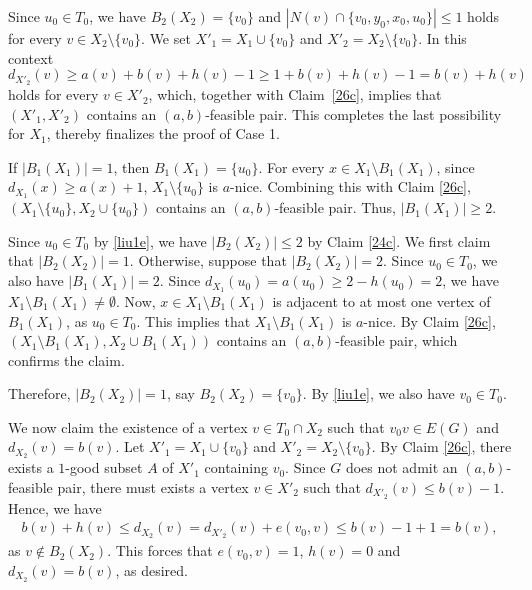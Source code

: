 \documentclass[11p]{elsarticle}
\theoremstyle{definition}
\begin{document}
 Since $u_0\in T_0$, we have $B_2(X_2)=\{v_0\}$ and $ \left|N(v)\cap\{v_0,y_0,x_0,u_0\} \right|\le 1 $ holds  for every $ v\in X_2\setminus\{v_0\} $. We set $X'_1=X_1\cup \{v_0\}$ and $X'_2=X_2\setminus \{v_0\}$. In this context $$d_{X'_2}(v)\ge a(v)+b(v)+h(v)-1\ge 1+b(v)+h(v)-1=b(v)+h(v)$$ holds for every $ v\in X'_2$, which, together with Claim~\ref{26c}, implies that  { $ (X'_1,X'_2) $ contains an $ (a,b) $-feasible pair}. This completes the last possibility for $X_1$, thereby finalizes the proof of Case 1.

\medskip{}

  If	$ \left|B_1(X_1)\right| =1$, then   $ B_1(X_1)=\{u_0\} $.    For every $ x\in X_1\setminus B_1(X_1) $, since $ d_{X_1}(x)\ge a(x)+1 $,    $ X_1\setminus\{u_0\} $ is $ a $-nice. Combining this with   Claim \ref{26c}, {$ (X_1\setminus\{u_0\}, X_2\cup \{u_0\}) $ contains an $ (a,b) $-feasible pair}. Thus,
$ \left|  B_1(X_1)\right| \ge 2 $.

  Since $u_0\in T_0$ by \eqref{liu1e}, we have   $|  B_2(X_2)|\le 2$ by Claim \ref{24c}. We first  claim that $ \left|  B_2(X_2)\right|=1 $. Otherwise, suppose that $ \left|  B_2(X_2)\right|=2 $. Since $u_0\in T_0$, we also have $ \left|  B_1(X_1)\right|=2.$
Since $d_{X_1}(u_0)=a(u_0)\ge 2-h(u_0)=2$, we have   $X_1\setminus B_1(X_1)\ne \emptyset$. Now, $x\in  X_1\setminus B_1(X_1)$ is adjacent to at most one vertex of $B_1(X_1)$, as   $u_0\in T_0$. This implies that $X_1\setminus B_1(X_1)$ is $a$-nice. By Claim \ref{26c},  $(X_1\setminus B_1(X_1), X_2\cup   B_1(X_1))$ {contains an $(a,b)$-feasible pair}, which confirms the claim.

Therefore, $ \left|  B_2(X_2)\right|=1$, say $ B_2(X_2)=\{v_0\}$.  By \eqref{liu1e}, we also have $v_0\in T_0$.


    We now claim the existence of a vertex $v\in T_0\cap X_2 $ such that $v_0v\in E(G) $ and $d_{X_2}(v)=b(v)$. Let $ X'_1=X_1\cup\{v_0\} $ and $ X'_2=X_2\setminus\{v_0\} $. By Claim \ref{26c},   there exists a $ 1 $-good subset $ A $ of  $ X'_1$ containing $v_0$. Since $G$ does not admit an $(a,b)$-feasible pair, there must {exists} a vertex $ v\in X'_2$ such that $ d_{X'_2}(v)\le b(v)-1 $. Hence, we have \begin{align*}
	b(v)+h(v)\le d_{X_2}(v)=	d_{X'_2}(v)+e(v_0,v)\le b(v)-1+1=b(v),
\end{align*}
as $v\not\in B_2(X_2)$. 
This forces that  $ e(v_0,v)=1 $, $ h(v)=0 $ and $ d_{X_2}(v)=b(v) $, as  desired.
\end{document}
